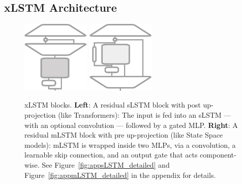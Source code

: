 \documentclass[dvipsnames]{article}
\begin{document}
\subsection{xLSTM Architecture}
\label{sec:xLSTMarch}

\begin{figure}
 \vspace{-0.3cm}
 \includegraphics[angle=0,width=0.29\textwidth]{./figures/desc_post_up_projection_backbone.pdf}
  \hfill
  \includegraphics[angle=0,width=0.29\textwidth]{./figures/desc_pre_up_projection_backbone.pdf}
       \caption{xLSTM blocks. {\bf Left}: A residual sLSTM block 
       with post up-projection 
       (like Transformers): 
       The input is fed into an sLSTM 
        --- with an optional convolution --- 
       followed by a gated MLP. 
        {\bf Right}: A residual mLSTM block with pre up-projection 
        (like State Space models): 
        mLSTM is wrapped inside two MLPs, via a convolution, 
        a learnable skip connection, and 
        an output gate that acts component-wise. 
        See Figure~\ref{fig:appsLSTM_detailed} and 
        Figure~\ref{fig:appmLSTM_detailed} in the appendix for details.
        \label{fig:Backbones} }
  \vspace{-0.6cm}
\end{figure}
\end{document}
